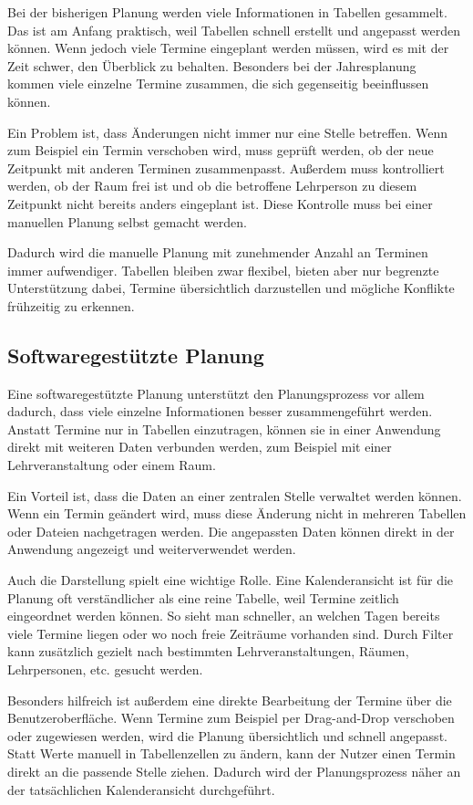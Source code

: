 \documentclass[12pt,a4paper]{article}
\begin{document}
Bei der bisherigen Planung werden viele Informationen in Tabellen gesammelt. Das ist am Anfang praktisch, weil Tabellen schnell erstellt und angepasst werden können. Wenn jedoch viele Termine eingeplant werden müssen, wird es mit der Zeit schwer, den Überblick zu behalten. Besonders bei der Jahresplanung kommen viele einzelne Termine zusammen, die sich gegenseitig beeinflussen können.

Ein Problem ist, dass Änderungen nicht immer nur eine Stelle betreffen. Wenn zum Beispiel ein Termin verschoben wird, muss geprüft werden, ob der neue Zeitpunkt mit anderen Terminen zusammenpasst. Außerdem muss kontrolliert werden, ob der Raum frei ist und ob die betroffene Lehrperson zu diesem Zeitpunkt nicht bereits anders eingeplant ist. Diese Kontrolle muss bei einer manuellen Planung selbst gemacht werden.

Dadurch wird die manuelle Planung mit zunehmender Anzahl an Terminen immer aufwendiger. Tabellen bleiben zwar flexibel, bieten aber nur begrenzte Unterstützung dabei, Termine übersichtlich darzustellen und mögliche Konflikte frühzeitig zu erkennen.

\subsection{Softwaregestützte Planung}

Eine softwaregestützte Planung unterstützt den Planungsprozess vor allem dadurch, dass viele einzelne Informationen besser zusammengeführt werden. Anstatt Termine nur in Tabellen einzutragen, können sie in einer Anwendung direkt mit weiteren Daten verbunden werden, zum Beispiel mit einer Lehrveranstaltung oder einem Raum.

Ein Vorteil ist, dass die Daten an einer zentralen Stelle verwaltet werden können. Wenn ein Termin geändert wird, muss diese Änderung nicht in mehreren Tabellen oder Dateien nachgetragen werden. Die angepassten Daten können direkt in der Anwendung angezeigt und weiterverwendet werden.

Auch die Darstellung spielt eine wichtige Rolle. Eine Kalenderansicht ist für die Planung oft verständlicher als eine reine Tabelle, weil Termine zeitlich eingeordnet werden können. So sieht man schneller, an welchen Tagen bereits viele Termine liegen oder wo noch freie Zeiträume vorhanden sind. Durch Filter kann zusätzlich gezielt nach bestimmten Lehrveranstaltungen, Räumen, Lehrpersonen, etc. gesucht werden.

Besonders hilfreich ist außerdem eine direkte Bearbeitung der Termine über die Benutzeroberfläche. Wenn Termine zum Beispiel per Drag-and-Drop verschoben oder zugewiesen werden, wird die Planung übersichtlich und schnell angepasst. Statt Werte manuell in Tabellenzellen zu ändern, kann der Nutzer einen Termin direkt an die passende Stelle ziehen. Dadurch wird der Planungsprozess näher an der tatsächlichen Kalenderansicht durchgeführt.
\end{document}
